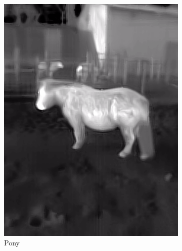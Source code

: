 \documentclass{l4proj}
\begin{document}
\begin{figure}[ht]
\begin{subfigure}[h!]{0.18\textwidth}
    \includegraphics[width=\textwidth, trim={0cm 2.5cm 0cm 2.5cm}, clip]{images/dataset/pony/lwir.png}
    \caption{Pony}
  \end{subfigure}
  \begin{subfigure}[h!]{0.18\textwidth}

\end{subfigure}
\end{figure}
\end{document}

